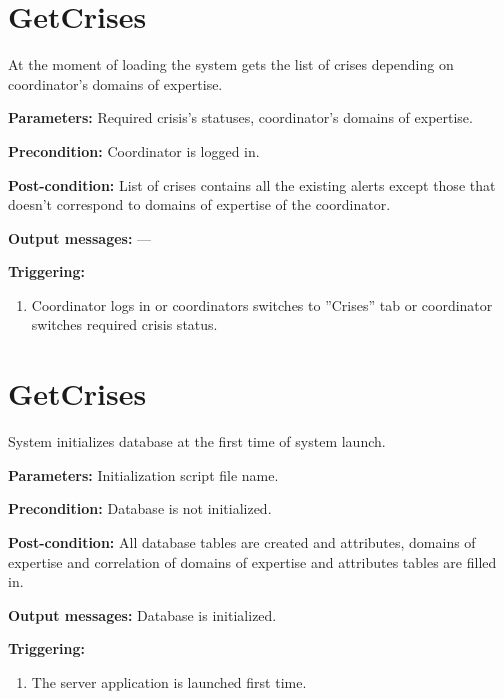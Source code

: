 \section{GetCrises}
\label{operation:GetCrises}
At the moment of loading the system gets the list of crises depending on
coordinator’s domains of expertise.

\begin{description}

\item \textbf{Parameters:} Required crisis’s statuses, coordinator’s domains of
expertise.
\item \textbf{Precondition:} Coordinator is logged in.
\item \textbf{Post-condition:} List of crises contains all the existing alerts
except those that doesn’t correspond to domains of expertise of the coordinator.

\item \textbf{Output messages:} ---

\item \textbf{Triggering:}
\begin{enumerate}
\item Coordinator logs in or coordinators switches to ''Crises'' tab or
coordinator switches required crisis status.
\end{enumerate}
 
\end{description}

\section{GetCrises}
\label{operation:GetCrises}
System initializes database at the first time of system launch.

\begin{description}

\item \textbf{Parameters:} Initialization script file name.
\item \textbf{Precondition:} Database is not initialized.
\item \textbf{Post-condition:} All database tables are created and attributes,
domains of expertise and correlation of domains of expertise and attributes
tables are filled in.

\item \textbf{Output messages:} Database is initialized.

\item \textbf{Triggering:}
\begin{enumerate}
\item The server application is launched first time.
\end{enumerate}
 
\end{description}